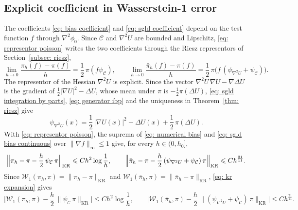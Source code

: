 \documentclass{article}
\newcommand{\Le}{\leqslant}
\newcommand{\norm}[1]{\lVert #1 \rVert}
\numberwithin{equation}{section}
\begin{document}
\subsection{Explicit coefficient in Wasserstein-1 error}
\label{subsec: w1}

The coefficients \eqref{eq: bias coefficient} and \eqref{eq: sgld coefficient} depend on the test function $f$ through $\nabla^2 \phi_0$. Since $\mathcal C$ and $\nabla^2 U$ are bounded and Lipschitz, \eqref{eq: representor poisson} writes the two coefficients through the Riesz representors of Section~\ref{subsec: riesz},
\begin{equation}
    \lim_{h \to 0} \frac{\pi_h(f) - \pi(f)}{h} = \frac12\, \pi( f \psi_{\mathcal C} ) , \qquad
    \lim_{h \to 0} \frac{\bar\pi_h(f) - \pi(f)}{h} = \frac12\, \pi\bigl( f\, ( \psi_{\nabla^2 U} + \psi_{\mathcal C} ) \bigr) .
    \label{eq: coefficients riesz}
\end{equation}
The representor of the Hessian $\nabla^2 U$ is explicit. Since the vector $\nabla^2 U\, \nabla U - \nabla \Delta U$ is the gradient of $\frac12 |\nabla U|^2 - \Delta U$, whose mean under $\pi$ is $-\frac12 \pi(\Delta U)$, \eqref{eq: sgld integration by parts}, \eqref{eq: generator ibp} and the uniqueness in Theorem~\ref{thm: riesz} give
\begin{equation}
    \psi_{\nabla^2 U}(x) = \frac12\, |\nabla U(x)|^2 - \Delta U(x) + \frac12\, \pi(\Delta U) .
    \label{eq: psi hessian}
\end{equation}
With \eqref{eq: representor poisson}, the suprema of \eqref{eq: numerical bias} and \eqref{eq: sgld bias continuous} over $\norm{\nabla f}_\infty \Le 1$ give, for every $h \in (0,h_0]$,
\begin{equation}
    \Bigl\| \pi_h - \pi - \frac h2\, \psi_{\mathcal C}\, \pi \Bigr\|_{\mathrm{KR}} \Le C h^2 \log\frac1h , \qquad
    \Bigl\| \bar\pi_h - \pi - \frac h2\, ( \psi_{\nabla^2 U} + \psi_{\mathcal C} )\, \pi \Bigr\|_{\mathrm{KR}} \Le C h^{\frac{21}{11}} .
    \label{eq: kr expansion}
\end{equation}
Since $\mathcal W_1(\pi_h, \pi) = \norm{\pi_h - \pi}_{\mathrm{KR}}$ and $\mathcal W_1(\bar\pi_h, \pi) = \norm{\bar\pi_h - \pi}_{\mathrm{KR}}$, \eqref{eq: kr expansion} gives
\begin{equation}
    \biggl| \mathcal W_1(\pi_h, \pi) - \frac h2\, \norm{\psi_{\mathcal C}\, \pi}_{\mathrm{KR}} \biggr| \Le C h^2 \log\frac1h , \qquad
    \biggl| \mathcal W_1(\bar\pi_h, \pi) - \frac h2\, \norm{( \psi_{\nabla^2 U} + \psi_{\mathcal C} )\, \pi}_{\mathrm{KR}} \biggr| \Le C h^{\frac{21}{11}} .
    \label{eq: w1 limits}
\end{equation}
\end{document}
